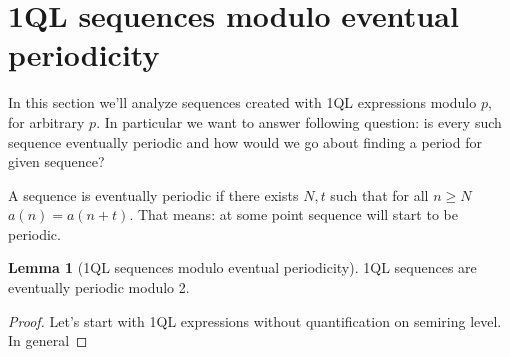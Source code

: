 \documentclass[12pt]{article}
\theoremstyle{definition}
\newtheorem{lemma}[theorem]{Lemma}
\begin{document}
\section{1QL sequences modulo eventual periodicity}
In this section we'll analyze sequences created with 1QL expressions modulo $p$, for arbitrary $p$. In particular we want to answer following question: is every such sequence eventually periodic and how would we go about finding a period for given sequence?

A sequence is eventually periodic if there exists $N, t$ such that for all $n \geq N$ $a(n) = a(n+t)$. That means: at some point sequence will start to be periodic.

\begin{lemma}[1QL sequences modulo eventual periodicity]
1QL sequences are eventually periodic modulo 2.
\end{lemma}

\begin{proof}
Let's start with 1QL expressions without quantification on semiring level. In general 
\end{proof}
\end{document}
